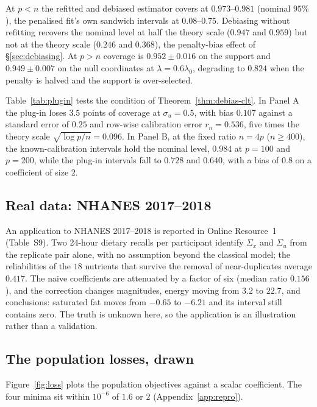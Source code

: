 \documentclass[12pt,a4paper]{article}
\theoremstyle{definition}
\theoremstyle{remark}
\begin{document}
At $p<n$ the refitted and debiased estimator covers at $0.973$--$0.981$ (nominal $95\%$), the
penalised fit's own sandwich intervals at $0.08$--$0.75$. Debiasing without refitting
recovers the nominal level at half the theory scale ($0.947$ and $0.959$) but not at the
theory scale ($0.246$ and $0.368$), the penalty-bias effect of \S\ref{sec:debiasing}. At
$p>n$ coverage is $0.952\pm0.016$ on the support and $0.949\pm0.007$ on the null
coordinates at $\lambda=0.6\lambda_0$, degrading to $0.824$ when the penalty is halved and
the support is over-selected.



Table~\ref{tab:plugin} tests the condition of Theorem~\ref{thm:debias-clt}. In Panel A the
plug-in loses $3.5$ points of coverage at $\sigma_u=0.5$, with bias $0.107$ against a
standard error of $0.25$ and row-wise calibration error $r_n=0.536$, five times the
theory scale $\sqrt{\log p/n}=0.096$. In Panel B, at the fixed ratio $n=4p$ ($n\ge400$),
the known-calibration intervals hold the nominal level, $0.984$ at $p=100$ and $p=200$,
while the plug-in intervals fall to $0.728$ and $0.640$, with a bias of $0.8$ on a
coefficient of size $2$.



\subsection{Real data: NHANES 2017--2018}
\label{sec:nhanes}

An application to NHANES 2017--2018 is reported in Online Resource~1 (Table~S9). Two
24-hour dietary recalls per participant identify $\Sigma_x$ and $\Sigma_u$ from the
replicate pair alone, with no assumption beyond the classical model; the reliabilities of
the $18$ nutrients that survive the removal of near-duplicates average $0.417$. The naive
coefficients are attenuated by a factor of six (median ratio $0.156$), and the correction
changes magnitudes, energy moving from $3.2$ to $22.7$, and conclusions: saturated fat
moves from $-0.65$ to $-6.21$ and its interval still contains zero. The truth is unknown here, so the application is an illustration rather than a validation.

\subsection{The population losses, drawn}
\label{sec:curves}

Figure~\ref{fig:loss} plots the population objectives against a scalar coefficient. The
four minima sit within $10^{-6}$ of $1.6$ or $2$ (Appendix~\ref{app:repro}).
\end{document}
